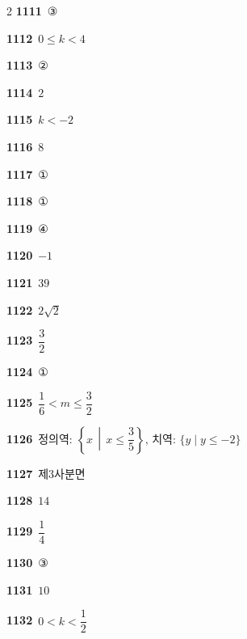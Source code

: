 \documentclass[10pt,a4paper]{article}
\begin{document}
\begin{multicols}{2}
\noindent\textbf{1111}\ ③\par
\noindent\textbf{1112}\ $0\le k<4$\par
\noindent\textbf{1113}\ ②\par
\noindent\textbf{1114}\ $2$\par
\noindent\textbf{1115}\ $k<-2$\par
\noindent\textbf{1116}\ $8$\par
\noindent\textbf{1117}\ ①\par
\noindent\textbf{1118}\ ①\par
\noindent\textbf{1119}\ ④\par
\noindent\textbf{1120}\ $-1$\par
\noindent\textbf{1121}\ $39$\par
\noindent\textbf{1122}\ $2\sqrt{2}$\par
\noindent\textbf{1123}\ $\dfrac{3}{2}$\par
\noindent\textbf{1124}\ ①\par
\noindent\textbf{1125}\ $\dfrac{1}{6}<m\le \dfrac{3}{2}$\par
\noindent\textbf{1126}\ 정의역: $\left\{x \,\middle|\, x\le \dfrac{3}{5}\right\}$, 치역: $\{y \mid y\le -2\}$\par
\noindent\textbf{1127}\ 제$3$사분면\par
\noindent\textbf{1128}\ $14$\par
\noindent\textbf{1129}\ $\dfrac{1}{4}$\par
\noindent\textbf{1130}\ ③\par
\noindent\textbf{1131}\ $10$\par
\noindent\textbf{1132}\ $0<k<\dfrac{1}{2}$\par
\end{multicols}
\end{document}
